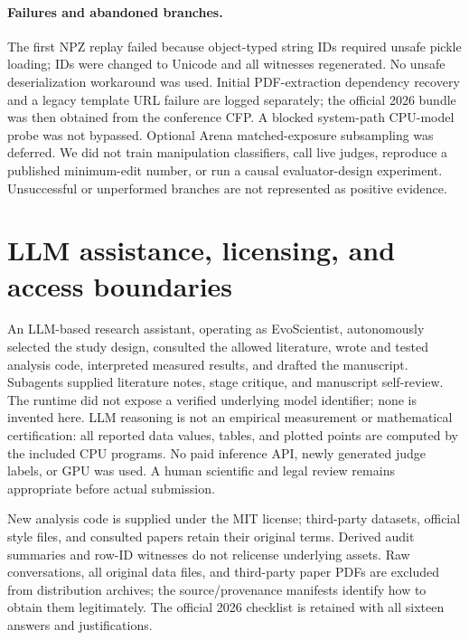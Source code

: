 \paragraph{Failures and abandoned branches.}
The first NPZ replay failed because object-typed string IDs required unsafe pickle loading; IDs were changed to Unicode and all witnesses regenerated. No unsafe deserialization workaround was used. Initial PDF-extraction dependency recovery and a legacy template URL failure are logged separately; the official 2026 bundle was then obtained from the conference CFP. A blocked system-path CPU-model probe was not bypassed. Optional Arena matched-exposure subsampling was deferred. We did not train manipulation classifiers, call live judges, reproduce a published minimum-edit number, or run a causal evaluator-design experiment. Unsuccessful or unperformed branches are not represented as positive evidence.

\section{LLM assistance, licensing, and access boundaries}\label{app:llm}
An LLM-based research assistant, operating as EvoScientist, autonomously selected the study design, consulted the allowed literature, wrote and tested analysis code, interpreted measured results, and drafted the manuscript. Subagents supplied literature notes, stage critique, and manuscript self-review. The runtime did not expose a verified underlying model identifier; none is invented here. LLM reasoning is not an empirical measurement or mathematical certification: all reported data values, tables, and plotted points are computed by the included CPU programs. No paid inference API, newly generated judge labels, or GPU was used. A human scientific and legal review remains appropriate before actual submission.

New analysis code is supplied under the MIT license; third-party datasets, official style files, and consulted papers retain their original terms. Derived audit summaries and row-ID witnesses do not relicense underlying assets. Raw conversations, all original data files, and third-party paper PDFs are excluded from distribution archives; the source/provenance manifests identify how to obtain them legitimately. The official 2026 checklist is retained with all sixteen answers and justifications.

